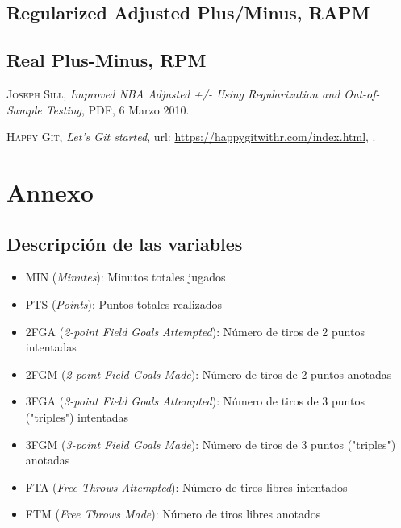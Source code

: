 \documentclass[paper=a4, fontsize=9pt]{article}
\begin{document}
\subsection{Regularized Adjusted Plus/Minus, RAPM}

\subsection{Real Plus-Minus, RPM}

\clearpage


\begin{thebibliography}{X}
	 \textsc{Joseph Sill}, \textit{Improved NBA Adjusted +/- Using Regularization and Out-of-Sample Testing}, PDF, 6 Marzo 2010.
	
	 \textsc{Happy Git}, \textit{Let’s Git started}, url: \url{https://happygitwithr.com/index.html}, .
\end{thebibliography}

\clearpage

\section{Annexo}

\subsection{Descripción de las variables} \label{sec:Annexo1}

\begin{itemize}
\item MIN (\emph{Minutes}): Minutos totales jugados
\item PTS (\emph{Points}): Puntos totales realizados
\item 2FGA (\emph{2-point Field Goals Attempted}): Número de tiros de 2 puntos intentadas
\item 2FGM (\emph{2-point Field Goals Made}): Número de tiros de 2 puntos anotadas
\item 3FGA (\emph{3-point Field Goals Attempted}): Número de tiros de 3 puntos ("triples") intentadas
\item 3FGM (\emph{3-point Field Goals Made}): Número de tiros de 3 puntos ("triples") anotadas
\item FTA (\emph{Free Throws Attempted}): Número de tiros libres intentados
\item FTM (\emph{Free Throws Made}): Número de tiros libres anotados
\end{itemize}
\end{document}
